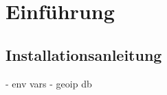\chapter{Einführung}\label{AppendixEinführung}

\section{Installationsanleitung}

- env vars
- geoip db

